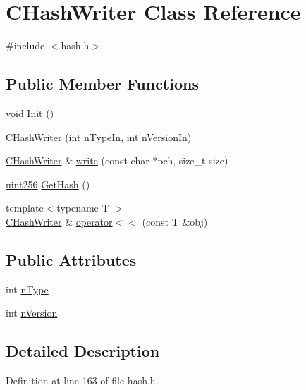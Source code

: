 \hypertarget{class_c_hash_writer}{}\section{C\+Hash\+Writer Class Reference}
\label{class_c_hash_writer}


{\ttfamily \#include $<$hash.\+h$>$}

\subsection*{Public Member Functions}
\begin{DoxyCompactItemize}
\item 
void \hyperlink{class_c_hash_writer_a941361586006cbb4c8eca534bb4bce4c}{Init} ()
\item 
\hyperlink{class_c_hash_writer_a81ce9a497a72fcb6b2612efdc20efbc9}{C\+Hash\+Writer} (int n\+Type\+In, int n\+Version\+In)
\item 
\hyperlink{class_c_hash_writer}{C\+Hash\+Writer} \& \hyperlink{class_c_hash_writer_a779360281eeeb4cc7485c8acae649bc9}{write} (const char $\ast$pch, size\+\_\+t size)
\item 
\hyperlink{classuint256}{uint256} \hyperlink{class_c_hash_writer_ae94a937211502eabf19477630090093a}{Get\+Hash} ()
\item 
{\footnotesize template$<$typename T $>$ }\\\hyperlink{class_c_hash_writer}{C\+Hash\+Writer} \& \hyperlink{class_c_hash_writer_a6551aed7315be5ba750680df18562f3a}{operator$<$$<$} (const T \&obj)
\end{DoxyCompactItemize}
\subsection*{Public Attributes}
\begin{DoxyCompactItemize}
\item 
int \hyperlink{class_c_hash_writer_ae8fe02b05db26a2647a7aeee035f022f}{n\+Type}
\item 
int \hyperlink{class_c_hash_writer_ad7d3642addab58385476dc0f9d55fa58}{n\+Version}
\end{DoxyCompactItemize}


\subsection{Detailed Description}


Definition at line 163 of file hash.\+h.



